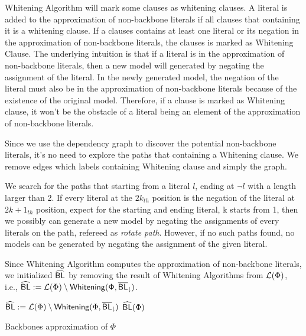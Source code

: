  Whitening Algorithm will mark some clauses as whitening clauses. A literal is added to the approximation of non-backbone literals if all clauses that containing it is a whitening clause. If a clauses contains at least one literal or its negation in the approximation of non-backbone literals, the clauses is marked as Whitening Clause. The underlying intuition is that if a literal is in the approximation of non-backbone literals, then a new model will generated by negating the assignment of the literal. In the newly generated model, the negation of the literal must also be in the approximation of non-backbone literals because of the existence of the original model. Therefore, if a clause is marked as Whitening clause, it won't be the obstacle of a literal being an element of the approximation of non-backbone literals.

 Since we use the dependency graph to discover the potential non-backbone literals, it's no need to explore the paths that containing a Whitening clause. We remove edges which labels containing Whitening clause and simply the graph.

 We search for the paths that starting from a literal $l$, ending at $\neg l$ with a length larger than 2. If every literal at the $2k_{th}$ position is the negation of the literal at $2k+1_{th}$ position, expect for the starting and ending literal, k starts from 1, then we possibly can generate a new model by negating the assignments of every literals on the path, refereed as \emph{rotate path}. However, if no such paths found, no models can be generated by negating the assignment of the given literal.

  Since Whitening Algorithm computes the approximation of non-backbone literals, we initialized ${\sf \widehat{BL}}$ by removing the result of Whitening Algorithms from ${\cal L}(\Phi)$, i.e., ${\sf \widehat{BL}}:={\cal L}(\Phi)\setminus{\sf Whitening(\Phi,{\sf \overline{BL}_\downharpoonright})}$.


\begin{algorithm}
\SetAlgoShortEnd
\SetFillComment
{}
 
${\sf \widehat{BL}}:={\cal L}(\Phi)\setminus{\textsf{Whitening}}(\Phi,{\sf \overline{BL}_\downharpoonright})$\;
\Return ${\sf \widehat{BL}}(\Phi)$\;
\caption{Backbones approximation of $\Phi$}
\label{alg:nBLo}
\end{algorithm}

